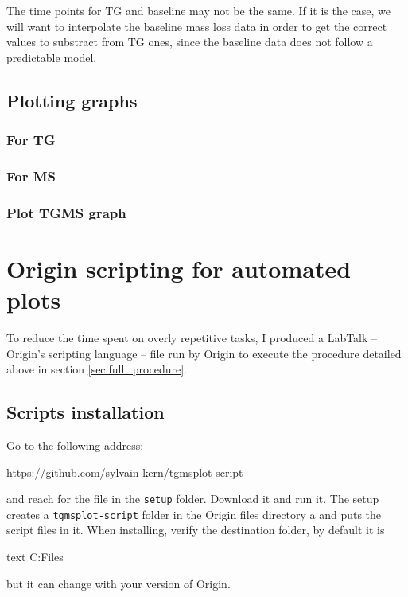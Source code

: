 \documentclass[a4paper, 11pt, raggedright, parskip]{tufte-style-article}
\begin{document}
The time points for TG and baseline may not be the same. If it is the case, we will want to interpolate the baseline mass loss data in order to get the correct values to substract from TG ones, since the baseline data does not follow a predictable model.


\subsection{Plotting graphs}


\subsubsection{For TG}


\subsubsection{For MS}


\subsubsection{Plot TGMS graph}


\section{Origin scripting for automated plots}
\label{sec:origin_scripting}	
	
To reduce the time spent on overly repetitive tasks, I produced a LabTalk -- Origin's scripting language -- file run by Origin to execute the procedure detailed above in section \ref{sec:full_procedure}.


\subsection{Scripts installation}

Go to the following address:

\noindent\url{https://github.com/sylvain-kern/tgmsplot-script}

\noindent and reach for the  file in the \texttt{setup} folder. Download it and run it. The setup creates a \texttt{tgmsplot-script} folder in the Origin files directory a and puts the script files in it. When installing, verify the destination folder, by default it is
\begin{codebox}{text}
C:\Program Files\OriginLab{}
\end{codebox}
but it can change with your version of Origin.
\end{document}

